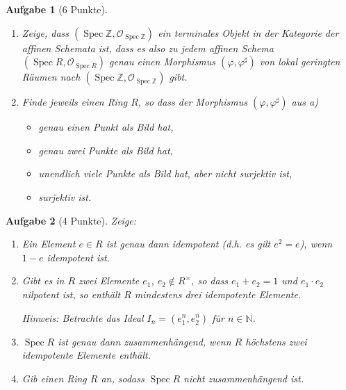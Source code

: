 \documentclass[paper = A4, fontsize=12pt, numbers=noendperiod, chapterprefix=true]{scrbook}
\theoremstyle{break}
\newtheorem{Aufg}{Aufgabe}
\theoremstyle{nonumberbreak}
\theoremstyle{nonumberplain}
\DeclareMathOperator{\Spec}{Spec}
\newcommand{\N}{\mathbb{N}}
\newcommand{\Z}{\mathbb{Z}}
\newcommand{\calO}{\mathcal{O}}
\begin{document}
\begin{Aufg}[6 Punkte]
 \begin{enumerate}%
 \item Zeige, dass $(\Spec \Z, \calO_{\Spec \Z})$ ein terminales Objekt in der Kategorie der affinen Schemata ist, dass es also zu jedem affinen Schema $(\Spec R,\calO_{\Spec R})$ genau einen Morphismus $(\varphi, \varphi^\sharp)$ von lokal geringten R\"aumen nach $(\Spec \Z, \calO_{\Spec \Z})$ gibt. 
  \item Finde jeweils einen Ring $R$, so dass der Morphismus $(\varphi, \varphi^\sharp)$ aus a)
 \begin{itemize}
  \item genau einen Punkt als Bild hat,
  \item genau zwei Punkte als Bild hat,
  \item unendlich viele Punkte als Bild hat, aber nicht surjektiv ist,
  \item surjektiv ist.
 \end{itemize}
\end{enumerate}
\end{Aufg}


\begin{Aufg}[4 Punkte]
Zeige:
\begin{enumerate}%
 \item Ein Element $e\in R$ ist genau dann idempotent (d.h. es gilt $e^2 = e$), wenn $1-e$ idempotent ist.
 \item Gibt es in $R$ zwei Elemente $e_1$, $e_2 \not\in R^\times$, so dass $e_1+e_2 =1$ und $e_1\cdot e_2$ nilpotent ist, so enth\"alt $R$ mindestens drei idempotente Elemente.
 
 \textit{Hinweis: Betrachte das Ideal $I_n = (e_1^n, e_2^n)$ f\"ur $n\in \N$.}
 \item $\Spec R$ ist genau dann zusammenh\"angend, wenn $R$ h\"ochstens zwei idempotente Elemente enth\"alt.
 \item Gib einen Ring $R$ an, sodass $\Spec R$ nicht zusammenh\"angend ist.
\end{enumerate}
\end{Aufg}
\end{document}
